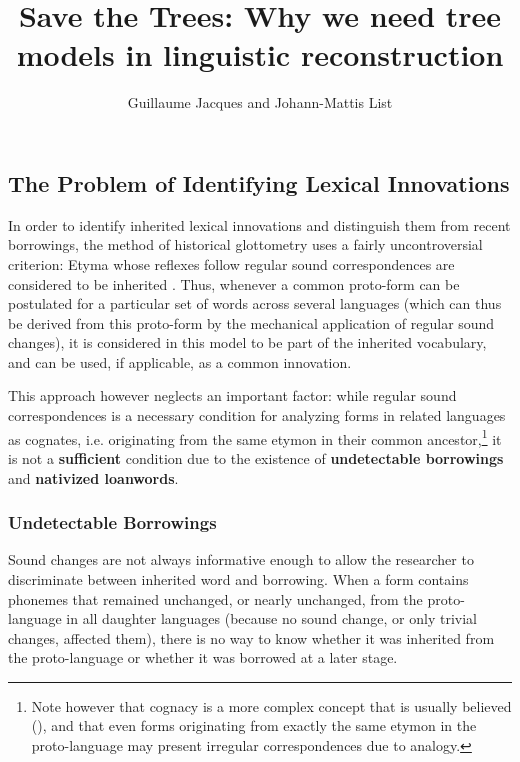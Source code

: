 \documentclass[svgnames,12pt]{scrartcl}
\title{Save the Trees: Why we need tree models in linguistic reconstruction}
\author{Guillaume Jacques and Johann-Mattis List}
\begin{document}
\maketitle


\subsection{The Problem of Identifying Lexical Innovations}
In order to identify inherited lexical innovations and distinguish them from recent borrowings, the method of historical glottometry uses a fairly uncontroversial criterion: Etyma whose reflexes follow regular sound correspondences are considered to be inherited \citep[176-8]{Francois2015}.
Thus, whenever a common proto-form can be postulated for a particular set of words across several languages (which can thus be derived from this proto-form by the mechanical application of regular sound changes), it is considered in this model to be part of the inherited vocabulary, and can be
used, if applicable, as a common innovation.

This approach however neglects an important factor: while regular sound correspondences is a necessary condition for analyzing forms in related languages as cognates, i.e. originating from the same etymon in their common ancestor,\footnote{Note however that cognacy is a more complex concept that is usually believed (\citealt{list16cognacy}), and that even forms originating from exactly the same etymon in the proto-language may present irregular correspondences due to analogy.} it is not a \textbf{sufficient} condition due to the existence of \textbf{undetectable borrowings} and
\textbf{nativized loanwords}.  
 

\subsubsection{Undetectable Borrowings}
Sound changes are not always informative enough to allow the researcher to discriminate between inherited word and borrowing. When a form contains phonemes that remained unchanged, or nearly unchanged, from the proto-language in all daughter languages (because no sound change, or only trivial changes, affected them), there is no way to know whether it was inherited from the proto-language or whether it was borrowed at a later stage. 
\end{document}
